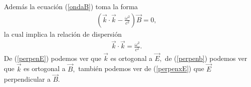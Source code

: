 \documentclass[letterpaper,12pt,oneside]{book}
\begin{document}
%
Adem\'as   la ecuaci\'on (\ref{ondaB}) toma la forma 
%
\begin{eqnarray}
\left( \vec k\cdot \vec k - \frac{\omega^2}{c^2}\right)\vec B=0,
\end{eqnarray}
%
la cual implica la relaci\'on de dispersi\'on 
%
\begin{eqnarray}
 \vec k\cdot \vec k = \frac{\omega^2}{c^2}.
\end{eqnarray}
%
 De (\ref{perpenE}) podemos ver que $\vec k$ es ortogonal a $\vec E,$ de (\ref{perpenb}) podemos ver que $\vec k$ es ortogonal a $\vec B,$ tambi\'en podemos ver de (\ref{perpenxE}) que $\vec E$ perpendicular a $\vec B.$


 
\end{document}
